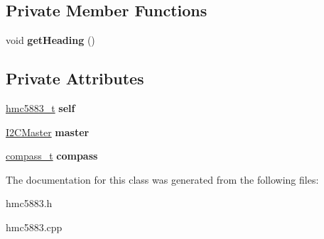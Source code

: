 \subsection*{Private Member Functions}
\begin{DoxyCompactItemize}
\item 
\mbox{\label{classHmc5883_ad4af7af089cc97b70cd75f705773e509}} 
void {\bfseries get\+Heading} ()
\end{DoxyCompactItemize}
\subsection*{Private Attributes}
\begin{DoxyCompactItemize}
\item 
\mbox{\label{classHmc5883_a7864e224789881243d69cefce89d7918}} 
\hyperlink{structhmc5883__t}{hmc5883\+\_\+t} {\bfseries self}
\item 
\mbox{\label{classHmc5883_a8c46d4fe172002c5020423939d2e98d1}} 
\hyperlink{classI2CMaster}{I2\+C\+Master} {\bfseries master}
\item 
\mbox{\label{classHmc5883_a3db3c0edeb0859b84b4530f935bc75b1}} 
\hyperlink{structcompass__t}{compass\+\_\+t} {\bfseries compass}
\end{DoxyCompactItemize}


The documentation for this class was generated from the following files\+:\begin{DoxyCompactItemize}
\item 
hmc5883.\+h\item 
hmc5883.\+cpp\end{DoxyCompactItemize}
